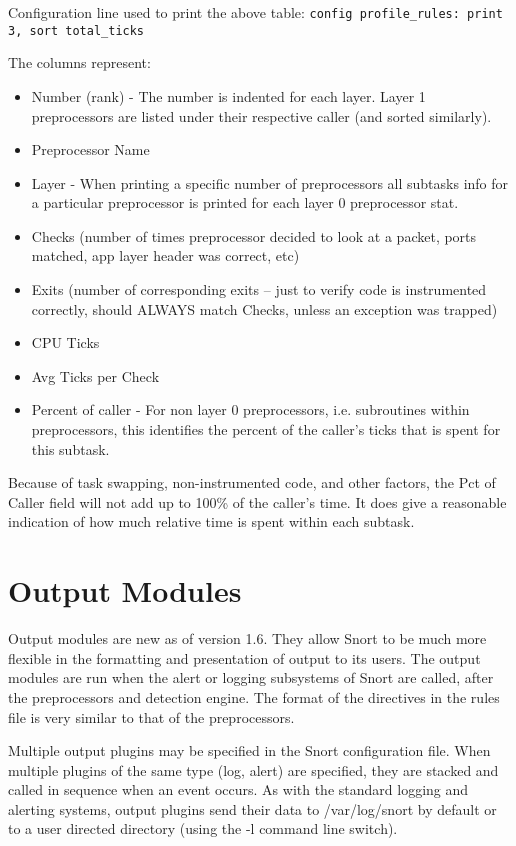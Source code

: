 \documentclass[english]{report}
\begin{document}
Configuration line used to print the above table: 
\subitem \texttt{config profile\_rules: print 3, sort total\_ticks}

The columns represent:
\begin{itemize}
\item Number (rank) - The number is indented for each layer.  Layer 1 preprocessors are
  listed under their respective caller (and sorted similarly).
\item Preprocessor Name
\item Layer - When printing a specific number of preprocessors all subtasks info
for a particular preprocessor is printed for each layer 0 preprocessor stat.
\item Checks (number of times preprocessor decided to look at a packet,
  ports matched, app layer header was correct, etc)
\item Exits  (number of corresponding exits -- just to verify code is
  instrumented correctly, should ALWAYS match Checks, unless an
  exception was trapped)
\item CPU Ticks
\item Avg Ticks per Check
\item Percent of caller - For non layer 0 preprocessors, i.e. subroutines within preprocessors,
  this identifies the percent of the caller's ticks that is spent for
  this subtask.
\end{itemize}

Because of task swapping, non-instrumented code, and other factors, the
Pct of Caller field will not add up to 100\% of the caller's time.
It does give a reasonable indication of how much relative time is
spent within each subtask.


\section{Output Modules \label{output config}}

Output modules are new as of version 1.6. They allow Snort to be much
more flexible in the formatting and presentation of output to its
users. The output modules are run when the alert or logging subsystems
of Snort are called, after the preprocessors and detection engine.
The format of the directives in the rules file is very similar to
that of the preprocessors.

Multiple output plugins may be specified in the Snort configuration
file. When multiple plugins of the same type (log, alert) are specified,
they are stacked and called in sequence when an
event occurs. As with the standard logging and alerting systems, output
plugins send their data to /var/log/snort by default or to a user
directed directory (using the -l command line
switch).
\end{document}
